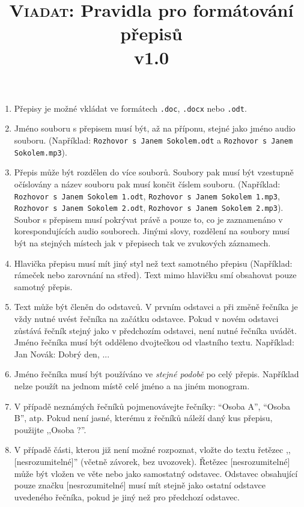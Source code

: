 \documentclass[10pt,a4paper]{article}
\title{\textsc{Viadat}: Pravidla pro formátování přepisů\\v1.0}
\date{}
\begin{document}
	\maketitle
\vspace{-1cm}

\begin{enumerate}
	\item Přepisy je možné vkládat ve formátech \texttt{.doc}, \texttt{.docx} nebo \texttt{.odt}.
	
	\item Jméno souboru s přepisem musí být, až na příponu, stejné jako jméno audio souboru. (Například: \texttt{Rozhovor s Janem Sokolem.odt} a \texttt{Rozhovor s Janem Sokolem.mp3}).
	
	\item Přepis může být rozdělen do více souborů. Soubory pak musí být  vzestupně očíslovány a název souboru pak musí končit číslem souboru.
	(Například: \texttt{Rozhovor s Janem Sokolem 1.odt}, \texttt{Rozhovor s Janem Sokolem 1.mp3}, \texttt{Rozhovor s Janem Sokolem 2.odt}, \texttt{Rozhovor s Janem Sokolem 2.mp3}). Soubor s přepisem musí pokrývat právě a pouze to, co je zaznamenáno v korespondujících audio souborech. Jinými slovy, rozdělení na soubory musí být na stejných místech jak v přepisech tak ve zvukových záznamech.  
	
	\item Hlavička přepisu musí mít jiný styl než text samotného přepisu (Například: rámeček nebo zarovnání na střed).
	Text mimo hlavičku smí obsahovat pouze samotný přepis.
	
	\item Text může být členěn do odstavců. V prvním odstavci a při změně řečníka je vždy nutné uvést řečníka na začátku odstavce.
	Pokud v novém odstavci zůstává řečník stejný jako v předchozím odstavci, není nutné řečníka uvádět. Jméno řečníka musí být odděleno dvojtečkou od vlastního textu. Například:\\
	Jan Novák: Dobrý den, ...
	
	\item Jméno řečníka musí být používáno ve \emph{stejné podobě} po celý přepis. Například nelze použít na jednom místě celé jméno a na jiném monogram.  
	
	\item V případě neznámých řečníků pojmenovávejte řečníky: ``Oso\-ba A'', ``Oso\-ba B'', atp. Pokud není jasné, kterému z řečníků náleží daný kus přepisu, použijte ,,Osoba ?''. 
	
	\item V případě části, kterou již není možné rozpoznat, vložte do textu řetězec ,,[nesrozumitelné]'' (včetně závorek, bez uvozovek).
	Řetězec [nesrozumitelné] může být vložen ve věte nebo jako samostatný odstavec.
	Odstavec obsahující pouze značku [nesrozumitelné] musí mít stejně jako ostatní odstavce uvedeného řečníka, pokud je jiný než pro předchozí odstavec.
\end{enumerate}
\end{document}
